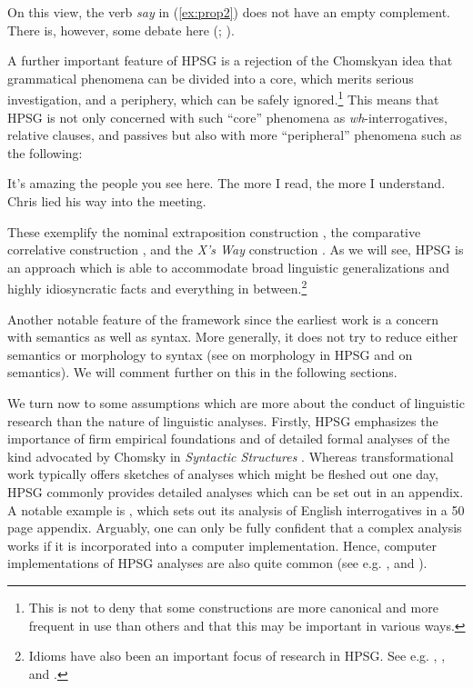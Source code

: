 \documentclass[output=paper
	        ,collection
	        ,collectionchapter
 	        ,biblatex
                ,babelshorthands
                ,newtxmath
                ,draftmode
                ,colorlinks, citecolor=brown
]{langscibook}
\begin{document}
\noindent
On this view, the verb \emph{say} in (\ref{ex:prop2}) does not have an empty complement. There is,
however, some debate here (\citealp{SF94a,Mueller2004e};
).

A further important feature of HPSG is a rejection of the Chomskyan idea that grammatical phenomena can be divided into a core, which merits serious investigation, and a periphery, which can be safely ignored.\footnote{%
  This is not to deny that some constructions are more canonical and more frequent in use than others and that this may be important in various ways.}
%
This means that HPSG is not only concerned with such ``core'' phenomena as \emph{wh}-interrogatives, relative clauses, and passives but also with more ``peripheral'' phenomena such as the following:


\eal\label{ex:prop3}
\ex\label{ex:prop3a}
It’s amazing the people you see here.
\ex\label{ex:prop3b}
The more I read, the more I understand.
\ex\label{ex:prop3c}
Chris lied his way into the meeting.
\zl

\noindent
These exemplify the nominal extraposition construction \citep{ML96a}, the comparative correlative construction \citep{Abeille2006a,AB2008a-u,Borsley2011a-u}, and the \emph{X’s Way} construction \citep[Section~7.4]{Sag2012a}. As we will see, HPSG is an approach which is able to accommodate broad linguistic generalizations and highly idiosyncratic facts and everything in between.\footnote{%
  Idioms have also been an important focus of research in HPSG. See e.g. , , and .}
%

Another notable feature of the framework since the earliest work is a concern with semantics as well as syntax. More generally, it does not try to reduce either semantics or morphology to syntax (see  on morphology in HPSG and  on semantics). We will comment further on this in the following sections.

We turn now to some assumptions which are more about the conduct of linguistic research than the nature of linguistic analyses. Firstly, HPSG emphasizes the importance of firm empirical foundations and of detailed formal analyses of the kind advocated by Chomsky in \emph{Syntactic Structures} \citep{Chomsky57a}\addpages. Whereas transformational work typically offers sketches of analyses which might be fleshed out one day, HPSG commonly provides detailed analyses which can be set out in an appendix. A notable example is \citet{GSag2000a-u}, which sets out its analysis of English interrogatives in a 50 page appendix. Arguably, one can only be fully confident that a complex analysis works if it is incorporated into a computer implementation. Hence, computer implementations of HPSG analyses are also quite common (see e.g. \citealp{Babel,MuellerCoreGram,Copestake2002a,BDFPS2010a-u,Bender2016}, and ).
\end{document}
